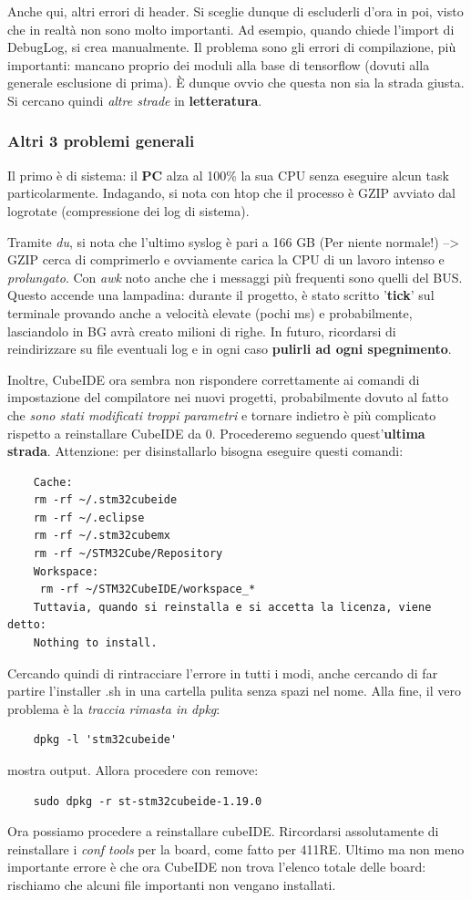 Anche qui, altri errori di header. Si sceglie dunque di escluderli d'ora in poi, visto che in realtà non sono molto importanti. Ad esempio, quando chiede l'import di DebugLog, si crea manualmente. Il problema sono gli errori di compilazione, più importanti: mancano proprio dei moduli alla base di tensorflow (dovuti alla generale esclusione di prima). 
È dunque ovvio che questa non sia la strada giusta. Si cercano quindi \textit{altre strade} in \textbf{letteratura}.

\subsubsection{Altri 3 problemi generali}
Il primo è di sistema: il \textbf{PC} alza al 100\% la sua CPU senza eseguire alcun task particolarmente. Indagando, si nota con htop che il processo è GZIP avviato dal logrotate (compressione dei log di sistema).

Tramite \textit{du}, si nota che l'ultimo syslog è pari a 166 GB (Per niente normale!) --> GZIP cerca di comprimerlo e ovviamente carica la CPU di un lavoro intenso e \textit{prolungato}. Con \textit{awk} noto anche che i messaggi più frequenti sono quelli del BUS. Questo accende una lampadina: durante il progetto, è stato scritto '\textbf{tick}' sul terminale provando anche a velocità elevate (pochi ms) e probabilmente, lasciandolo in BG avrà creato milioni di righe. In futuro, ricordarsi di reindirizzare su file eventuali log e in ogni caso \textbf{pulirli ad ogni spegnimento}.

Inoltre, CubeIDE ora sembra non rispondere correttamente ai comandi di impostazione del compilatore nei nuovi progetti, probabilmente dovuto al fatto che \textit{sono stati modificati troppi parametri} e tornare indietro è più complicato rispetto a reinstallare CubeIDE da 0. Procederemo seguendo quest'\textbf{ultima strada}.
Attenzione: per disinstallarlo bisogna eseguire questi comandi:

\begin{verbatim}
    Cache:
    rm -rf ~/.stm32cubeide 
    rm -rf ~/.eclipse 
    rm -rf ~/.stm32cubemx 
    rm -rf ~/STM32Cube/Repository
    Workspace:
     rm -rf ~/STM32CubeIDE/workspace_*
    Tuttavia, quando si reinstalla e si accetta la licenza, viene detto: 
    Nothing to install.
\end{verbatim}
Cercando quindi di rintracciare l'errore in tutti i modi, anche cercando di far partire l'installer .sh in una cartella pulita senza spazi nel nome. Alla fine, il vero problema è la \textit{traccia rimasta in dpkg}: 
\begin{verbatim}
    dpkg -l 'stm32cubeide' 
\end{verbatim}
mostra output. Allora procedere con remove: 
\begin{verbatim}
    sudo dpkg -r st-stm32cubeide-1.19.0
\end{verbatim}
Ora possiamo procedere a reinstallare cubeIDE. Rircordarsi assolutamente di reinstallare i \textit{conf tools} per la board, come fatto per 411RE.
Ultimo ma non meno importante errore è che ora CubeIDE non trova l'elenco totale delle board: rischiamo che alcuni file importanti non vengano installati.

